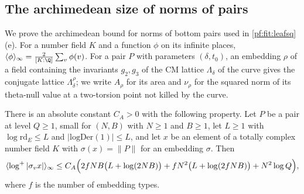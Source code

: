 \subsection{The archimedean size of norms of pairs}\label{sec:pf:fit:archnorm}

We prove the archimedean bound for norms of bottom pairs used in \cref{pf:fit:leafsq}(e). For a number field $K$ and a
function $\phi$ on its infinite places, $\fitmi{\phi}=\frac2{[K:\Q]}\sum_v\phi(v)$. For a pair $P$ with parameters
$(\delta,t_0)$, an embedding $\rho$ of a field containing the invariants $g_2,g_3$ of the CM lattice $\Lambda_\delta$ of the
curve gives the conjugate lattice $\Lambda_\delta^\rho$; we write $A_\rho$ for its area and $\nu_\rho$ for the squared norm of its
theta-null value at a two-torsion point not killed by the curve.

\begin{lemma}\label{pf:fit:archnorm}
There is an absolute constant $C_A>0$ with the following property. Let $P$ be a pair at level $Q\ge1$, small for $(N,B)$ with
$N\ge1$ and $B\ge1$, let $L\ge1$ with $\log\mathrm{rd}_E\le L$ and $|\mathrm{logDer}(1)|\le L$, and let $x$ be an element of a
totally complex number field $K$ with $\sigma(x)=\|P\|$ for an embedding $\sigma$. Then
\[
\langle \log^+|\sigma_vx|\rangle_{\infty}\le C_A\Bigl(2fNB\bigl(L+\log(2NB)\bigr)+fN^2\bigl(L+\log(2fNB)\bigr)+N^2\log Q\Bigr),
\]
where $f$ is the number of embedding types.
\end{lemma}


